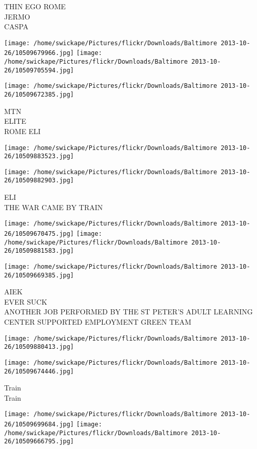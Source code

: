 \documentclass[10pt,letterpaper]{article}
\begin{document}
THIN EGO ROME\\
JERMO\\
CASPA
\pagebreak

\texttt{[image: /home/swickape/Pictures/flickr/Downloads/Baltimore 2013-10-26/10509679966.jpg]}
\texttt{[image: /home/swickape/Pictures/flickr/Downloads/Baltimore 2013-10-26/10509705594.jpg]}

\texttt{[image: /home/swickape/Pictures/flickr/Downloads/Baltimore 2013-10-26/10509672385.jpg]}

MTN\\
ELITE\\
ROME ELI
\pagebreak

\texttt{[image: /home/swickape/Pictures/flickr/Downloads/Baltimore 2013-10-26/10509883523.jpg]}

\vspace{0.25in}
\texttt{[image: /home/swickape/Pictures/flickr/Downloads/Baltimore 2013-10-26/10509882903.jpg]}

ELI\\
THE WAR CAME BY TRAIN
\pagebreak

\texttt{[image: /home/swickape/Pictures/flickr/Downloads/Baltimore 2013-10-26/10509670475.jpg]}
\texttt{[image: /home/swickape/Pictures/flickr/Downloads/Baltimore 2013-10-26/10509881583.jpg]}

\texttt{[image: /home/swickape/Pictures/flickr/Downloads/Baltimore 2013-10-26/10509669385.jpg]}

AIEK\\
EVER SUCK\\
ANOTHER JOB PERFORMED BY THE ST PETER'S ADULT LEARNING CENTER SUPPORTED EMPLOYMENT GREEN TEAM
\pagebreak

\texttt{[image: /home/swickape/Pictures/flickr/Downloads/Baltimore 2013-10-26/10509880413.jpg]}

\vspace{0.25in}
\texttt{[image: /home/swickape/Pictures/flickr/Downloads/Baltimore 2013-10-26/10509674446.jpg]}

Train\\
Train
\pagebreak

\texttt{[image: /home/swickape/Pictures/flickr/Downloads/Baltimore 2013-10-26/10509699684.jpg]}
\texttt{[image: /home/swickape/Pictures/flickr/Downloads/Baltimore 2013-10-26/10509666795.jpg]}
\end{document}
